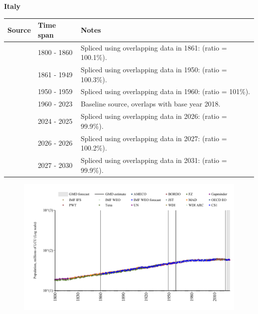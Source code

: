 \documentclass[12pt,a4paper,landscape]{article}
\begin{document}
\begin{adjustbox}{max totalsize={\paperwidth}{\paperheight},center}
\begin{minipage}[t][\textheight][t]{\textwidth}
\vspace*{0.5cm}
{}
\begin{center}
{\Large\bfseries Italy}
\end{center}
\vspace{0.5cm}
\begin{table}[H]
\centering
\small
\begin{tabular}{|l|l|l|}
\hline
\textbf{Source} & \textbf{Time span} & \textbf{Notes} \\
\hline
\rowcolor{white}\cite{Gapminder}& 1800 - 1860 &Spliced using overlapping data in 1861: (ratio = 100.1\%).\\
\rowcolor{lightgray}\cite{CS1_ITA}& 1861 - 1949 &Spliced using overlapping data in 1950: (ratio = 100.3\%).\\
\rowcolor{white}\cite{IMF_IFS}& 1950 - 1959 &Spliced using overlapping data in 1960: (ratio = 101\%).\\
\rowcolor{lightgray}\cite{WDI}& 1960 - 2023 &Baseline source, overlaps with base year 2018.\\
\rowcolor{white}\cite{OECD_EO}& 2024 - 2025 &Spliced using overlapping data in 2026: (ratio = 99.9\%).\\
\rowcolor{lightgray}\cite{AMECO}& 2026 - 2026 &Spliced using overlapping data in 2027: (ratio = 100.2\%).\\
\rowcolor{white}\cite{Gapminder}& 2027 - 2030 &Spliced using overlapping data in 2031: (ratio = 99.9\%).\\
\hline
\end{tabular}
\end{table}
\begin{figure}[H]
\centering
\includegraphics[width=\textwidth,height=0.6\textheight,keepaspectratio]{graphs/ITA_pop.pdf}
\end{figure}
\end{minipage}
\end{adjustbox}
\end{document}
